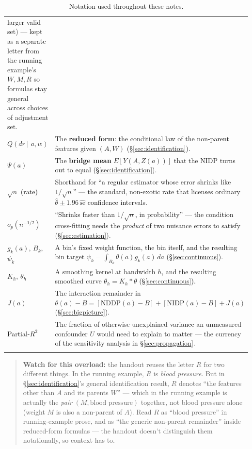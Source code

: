 \begin{longtable}{@{}p{3.0cm}p{10.2cm}@{}}
  larger valid set) --- kept as a separate letter from the running
  example's $W,M,R$ so formulas stay general across choices of adjustment
  set. \\
$Q(dr\mid a,w)$ & The \textbf{reduced form}: the conditional law of the
  non-parent features given $(A,W)$ (\S\ref{sec:identification}). \\
$\Psi(a)$ & The \textbf{bridge mean} $E[Y(A,Z(a))]$ that the NIDP turns out
  to equal (\S\ref{sec:identification}). \\
$\sqrt{n}$ (rate) & Shorthand for ``a regular estimator whose error shrinks
  like $1/\sqrt n$'' --- the standard, non-exotic rate that licenses
  ordinary $\hat\theta \pm 1.96\,\hat{\mathrm{se}}$ confidence intervals. \\
$o_p(n^{-1/2})$ & ``Shrinks faster than $1/\sqrt n$, in probability'' ---
  the condition cross-fitting needs the \emph{product} of two nuisance
  errors to satisfy (\S\ref{sec:estimation}). \\
$g_k(a)$, $B_k$, $\psi_k$ & A bin's fixed weight function, the bin itself,
  and the resulting bin target $\psi_k = \int_{B_k}\theta(a)g_k(a)\,da$
  (\S\ref{sec:continuous}). \\
$K_h$, $\theta_h$ & A smoothing kernel at bandwidth $h$, and the resulting
  smoothed curve $\theta_h = K_h * \theta$ (\S\ref{sec:continuous}). \\
$J(a)$ & The interaction remainder in
  $\theta(a)-B = [\mathrm{NDDP}(a)-B]+[\mathrm{NIDP}(a)-B]+J(a)$
  (\S\ref{sec:bigpicture}). \\
Partial-$R^2$ & The fraction of otherwise-unexplained variance an
  unmeasured confounder $U$ would need to explain to matter --- the
  currency of the sensitivity analysis in \S\ref{sec:propagation}. \\
\bottomrule
\caption{Notation used throughout these notes.}
\label{tab:notation}
\end{longtable}

\begin{quote}
\textbf{Watch for this overload:} the handout reuses the letter $R$ for two
different things. In the running example, $R$ is \emph{blood pressure}. But
in \S\ref{sec:identification}'s general identification result, $R$ denotes
``the features other than $A$ and its parents $W$'' --- which in the
running example is actually the \emph{pair} $(M, \text{blood pressure})$
together, not blood pressure alone (weight $M$ is also a non-parent of
$A$). Read $R$ as ``blood pressure'' in running-example prose, and as ``the
generic non-parent remainder'' inside reduced-form formulas --- the handout
doesn't distinguish them notationally, so context has to.
\end{quote}

